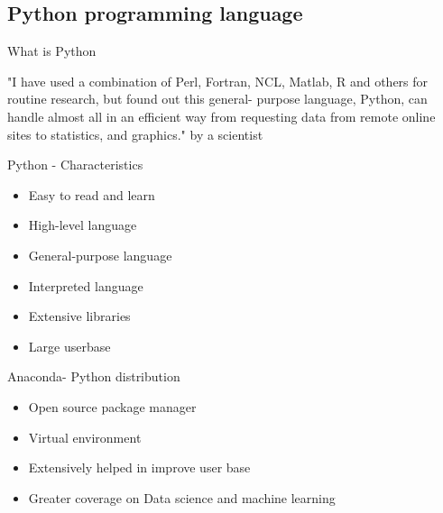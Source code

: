 \subsection[Python programming language]{Python programming language}

\begin{frame}{What is Python}
	\begin{beamerboxesrounded}{}
		"I have used a combination of Perl, Fortran, NCL, Matlab, R and others for routine research, but found out this general- purpose language, Python, can handle almost all in an efficient way from requesting data from remote online sites to statistics, and graphics."
		by a scientist
	\end{beamerboxesrounded}
\end{frame}

\begin{frame}{Python - Characteristics}
	\begin{beamerboxesrounded}{}
		\begin{itemize}
			\item Easy to read and learn
			\item High-level language
			\item General-purpose language
			\item Interpreted language
			\item Extensive libraries
			\item Large userbase 
		\end{itemize}
	\end{beamerboxesrounded}
\end{frame}

\begin{frame}{Anaconda- Python distribution}
	\begin{beamerboxesrounded}{}
		\begin{itemize}
			\item Open source package manager
			\item Virtual environment 
			\item Extensively helped in improve user base
			\item Greater coverage on Data science and machine learning 
		\end{itemize}
	\end{beamerboxesrounded}
\end{frame}

